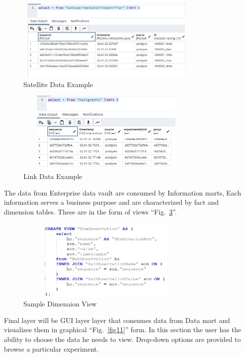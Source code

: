 \documentclass[conference]{IEEEtran}
\begin{document}
\begin{figure}[htbp]
\centerline{\includegraphics[width=9cm, height=4cm]{Figure8.png}}
\caption{Satellite Data Example}
\label{fig8}
\end{figure}

\begin{figure}[htbp]
\centerline{\includegraphics[width=9cm, height=4cm]{Figure9.png}}
\caption{Link Data Example}
\label{fig9}
\end{figure}

The data from Enterprise data vault are consumed by Information marts, Each information serves a business purpose and are characterized by fact and dimension tables. These are in the form of views ``Fig.~\ref{fig10}''.

\begin{figure}[htbp]
\centerline{\includegraphics[width=9cm, height=4cm]{Figure10.png}}
\caption{Sample Dimenaion View}
\label{fig10}
\end{figure}

Final layer will be GUI layer layer that consumes data from Data mart and visualizes them in graphical ``Fig.~\ref{fig11}'' form. In this section the user has the ability to choose the data he needs to view. Drop-down options are provided to browse a particular experiment.
\end{document}
